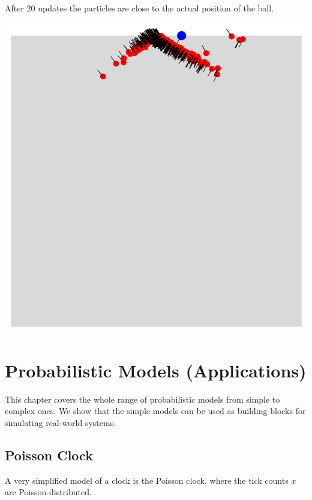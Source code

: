 \documentclass{tstextbook}
\begin{document}
\begin{example}
After 20 updates the particles are close to the actual position of the ball.

\includegraphics[scale=0.5, center]{images/particles_after_20_updates.pdf}

\end{example} 

\chapter{Probabilistic Models (Applications)}

\begin{summary}
  This chapter covers the whole range of probabilistic models from simple to complex ones. We show that the simple models can be used as building blocks for simulating real-world systems.
\end{summary}

\section{Poisson Clock}
A very simplified model of a clock is the Poisson clock, where the tick counts $x$ are Poisson-distributed.
\end{document}
